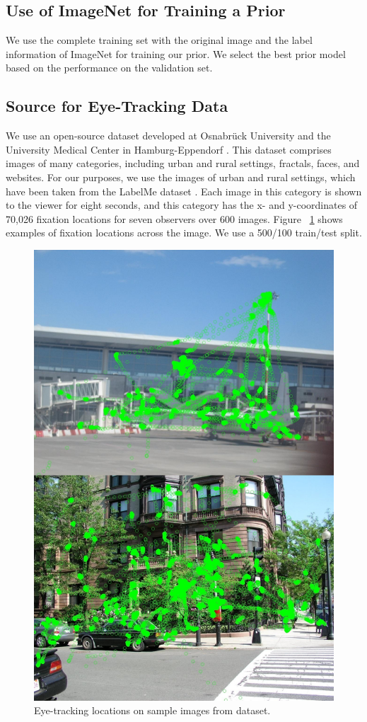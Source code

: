 \documentclass[10pt,twocolumn,letterpaper]{article}
\begin{document}
\subsection{Use of ImageNet for Training a Prior}
We use the complete training set with the original image and the label
information of ImageNet for training our prior. We select the best prior model
based on the performance on the validation set. 

\subsection{Source for Eye-Tracking Data}
We use an open-source dataset developed at Osnabr\"uck University and the
University Medical Center in Hamburg-Eppendorf \cite{Wilming01, Wilming02}. This dataset comprises images
of many categories, including urban and rural settings, fractals, faces, and
websites. For our purposes, we use the images of urban and rural settings,
which have been taken from the LabelMe dataset \cite{labelme}. Each image in
this category is shown to the viewer for eight seconds, and this category has
the x- and y-coordinates of 70,026 fixation locations for seven observers over
600 images. Figure ~\ref{fig:dataset} shows examples of fixation locations
across the image. We use a 500/100 train/test split.
\begin{figure}
    \begin{center}
        \includegraphics[width=0.5\columnwidth]{figures/movements.jpg}
    \end{center}
    \caption{Eye-tracking locations on sample images from dataset.}
    \label{fig:dataset}
\end{figure}
\end{document}
